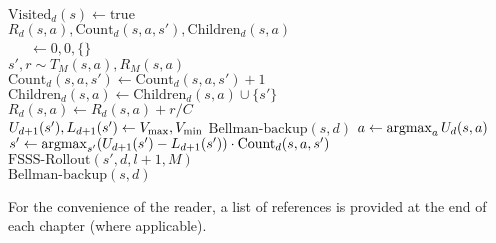 \begin{algorithm}[tb]
	\caption{$\mbox{FSSS-Rollout}(s, d, l, M)$}
	\label{alg:fs3-rollout}
	 {
		\Return
	}
	 {
		$\mbox{Visited}_d(s) \leftarrow \mbox{true}$\\
		 {
			$R_d(s,a),\mbox{Count}_d(s,a,s'),\mbox{Children}_d(s,a)$\\
			\ \ \ $\leftarrow 0, 0, \{\}$\\
			 {
				$s', r \sim T_M(s, a), R_M(s,a)$ \\
				$\mbox{Count}_d(s,a,s') \leftarrow \mbox{Count}_d(s,a,s') + 1$ \\
				$\mbox{Children}_d(s,a) \leftarrow \mbox{Children}_d(s,a) \cup \{s'\}$ \\
				$R_d(s,a) \leftarrow R_d(s, a)+r/C$\\
				 {
					 $U_{d+1}(s'), L_{d+1}(s') \leftarrow V_{\rm max}, V_{\rm min}$
				}
			}
		}
		$\mbox{Bellman-backup}(s, d)$
	}
	$a \leftarrow \argmax_a U_d(s,a)$\\
	$s' \leftarrow \argmax_{s'} (U_{d+1}(s')-L_{d+1}(s')) \cdot \mbox{Count}_d(s,a,s')$\\
	$\mbox{FSSS-Rollout}(s', d, l+1, M)$\\
	$\mbox{Bellman-backup}(s, d)$\\
	\Return
\end{algorithm}



%
\ifperchapterbib%
For the convenience of the reader, a list of references is provided at the end of each chapter (where applicable).
\ifendbib%
\else\fi%
\else\fi%
